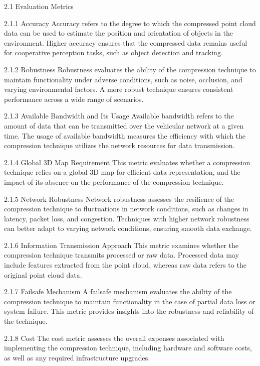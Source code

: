 \documentclass[conference]{IEEEtran}
\begin{document}
2.1 Evaluation Metrics

2.1.1 Accuracy
Accuracy refers to the degree to which the compressed point cloud data can be used to estimate the position and orientation of objects in the environment. Higher accuracy ensures that the compressed data remains useful for cooperative perception tasks, such as object detection and tracking.

2.1.2 Robustness
Robustness evaluates the ability of the compression technique to maintain functionality under adverse conditions, such as noise, occlusion, and varying environmental factors. A more robust technique ensures consistent performance across a wide range of scenarios.

2.1.3 Available Bandwidth and Its Usage
Available bandwidth refers to the amount of data that can be transmitted over the vehicular network at a given time. The usage of available bandwidth measures the efficiency with which the compression technique utilizes the network resources for data transmission.

2.1.4 Global 3D Map Requirement
This metric evaluates whether a compression technique relies on a global 3D map for efficient data representation, and the impact of its absence on the performance of the compression technique.

2.1.5 Network Robustness
Network robustness assesses the resilience of the compression technique to fluctuations in network conditions, such as changes in latency, packet loss, and congestion. Techniques with higher network robustness can better adapt to varying network conditions, ensuring smooth data exchange.

2.1.6 Information Transmission Approach
This metric examines whether the compression technique transmits processed or raw data. Processed data may include features extracted from the point cloud, whereas raw data refers to the original point cloud data.

2.1.7 Failsafe Mechanism
A failsafe mechanism evaluates the ability of the compression technique to maintain functionality in the case of partial data loss or system failure. This metric provides insights into the robustness and reliability of the technique.

2.1.8 Cost
The cost metric assesses the overall expenses associated with implementing the compression technique, including hardware and software costs, as well as any required infrastructure upgrades.



\end{document}
